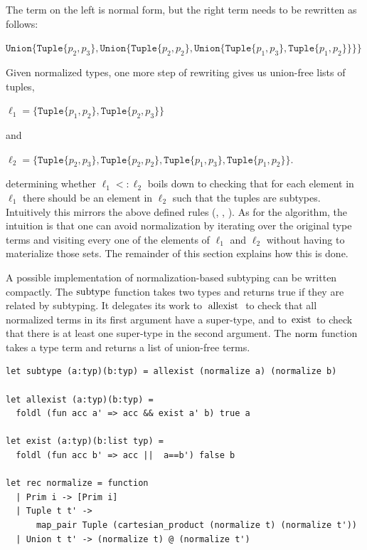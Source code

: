\documentclass[a4paper,english]{lipics-v2019}
\newcommand{\xt}[1]{\texttt{#1}}
\newcommand{\union}[2]{\xt{Union\{}#1,#2\xt{\}}}
\renewcommand{\c}[1]{\ensuremath{\text{\lstinline{#1}}}\xspace}
\newcommand{\tuple}[1]{\xt{Tuple\{}#1\xt{\}}}
\begin{document}
\noindent
The term on the left is normal form, but the right term  needs to be
rewritten as follows:

\medskip
$\union{ \tuple{p_2,p_3}}
  {\union{ \tuple{p_2,p_2}}
    {\union{ \tuple{p_1,p_3}}
           {\tuple{p_1,p_2}}}}$
\medskip

\noindent
Given normalized types, one more step of rewriting gives us union-free
lists of tuples,

\medskip
$\ell_1 = \{  \tuple{p_1,p_2}, \tuple{p_2,p_3}  \}$
\medskip

\noindent and

\medskip
$\ell_2 = \{  \tuple{p_2,p_3}, \tuple{p_2,p_2}, \tuple{p_1,p_3}, 
          \tuple{p_1,p_2} \}$.
\medskip

\noindent determining whether $\ell_1 <: \ell_2$ boils down to checking that
for each element in $\ell_1$ there should be an element in $\ell_2$ such
that the tuples are subtypes. Intuitively this mirrors the above defined
rules ({\sc [allexist]}, {\sc [existL/R]}, {\sc [tuple]}). As for the
algorithm, the intuition is that one can avoid normalization by iterating
over the original type terms and visiting every one of the elements of
$\ell_1$ and $\ell_2$ without having to materialize those sets. The
remainder of this section explains how this is done.

A possible implementation of normalization-based subtyping can be written
compactly.  The \c{subtype} function takes two types and returns true if
they are related by subtyping. It delegates its work to \c{allexist} to
check that all normalized terms in its first argument have a super-type, and
to \c{exist} to check that there is at least one super-type in the second
argument.  The \c{norm} function takes a type term and returns a list of
union-free terms.

\begin{lstlisting}
let subtype (a:typ)(b:typ) = allexist (normalize a) (normalize b)

let allexist (a:typ)(b:typ) = 
  foldl (fun acc a' => acc && exist a' b) true a

let exist (a:typ)(b:list typ) = 
  foldl (fun acc b' => acc ||  a==b') false b

let rec normalize = function
  | Prim i -> [Prim i]
  | Tuple t t' -> 
      map_pair Tuple (cartesian_product (normalize t) (normalize t'))
  | Union t t' -> (normalize t) @ (normalize t')
\end{lstlisting}


\end{document}
